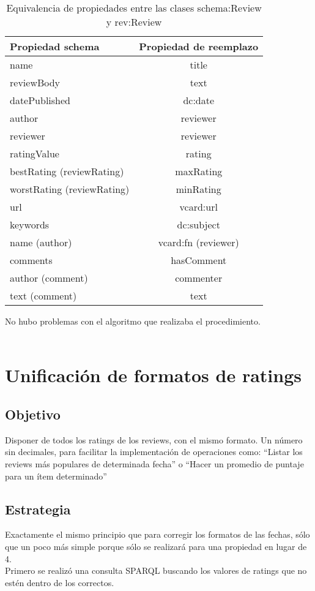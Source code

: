 \begin{table}[h]
\begin{tabular}{| l | c |}\hline
Propiedad schema & Propiedad de reemplazo\\\hline
name & title \\
reviewBody & text \\
datePublished & dc:date \\
author & reviewer \\
reviewer & reviewer \\
ratingValue & rating\\
bestRating (reviewRating) & maxRating\\
worstRating (reviewRating)& minRating\\
url & vcard:url\\
keywords & dc:subject\\
name (author) & vcard:fn (reviewer)\\
comments & hasComment\\
author (comment) & commenter \\
text (comment) & text \\\hline
\end{tabular}
\caption{Equivalencia de propiedades entre las clases schema:Review y rev:Review}
\label{table:PropertyEquiv}
\end{table}
No hubo problemas con el algoritmo que realizaba el procedimiento.
\\
\\
\section{Unificación de formatos de ratings}
\label{section:unificacion-ratings}

\subsection*{Objetivo} Disponer de todos los ratings de los reviews, con el mismo formato. Un número sin decimales, para facilitar la implementación 
de operaciones como: ``Listar los reviews más populares de determinada fecha'' o ``Hacer un promedio de puntaje para un ítem determinado''

\subsection*{Estrategia} Exactamente el mismo principio que para corregir los formatos de las fechas, sólo que un poco más simple porque sólo se realizará 
para una propiedad en lugar de 4.
\\
Primero se realizó una consulta SPARQL buscando los valores de ratings que no estén dentro de los correctos. \\

